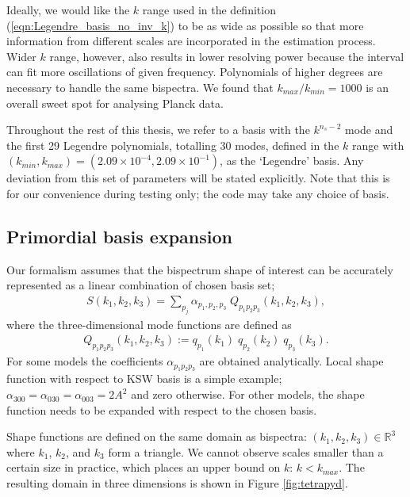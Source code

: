 Ideally, we would like the $k$ range used in the definition (\ref{eqn:Legendre_basis_no_inv_k}) to be as wide as possible so that more information from different scales are incorporated in the estimation process. Wider $k$ range, however, also results in lower resolving power because the interval can fit more oscillations of given frequency. Polynomials of higher degrees are necessary to handle the same bispectra. We found that $k_{max}/k_{min} = 1000$ is an overall sweet spot for analysing Planck data.

Throughout the rest of this thesis, we refer to a basis with the $k^{n_s - 2}$ mode and the first 29 Legendre polynomials, totalling 30 modes, defined in the $k$ range with $(k_{min}, k_{max}) = (2.09 \times 10^{-4}, 2.09 \times 10^{-1})$, as the `Legendre' basis. Any deviation from this set of parameters will be stated explicitly. Note that this is for our convenience during testing only; the code may take any choice of basis.


\subsection{Primordial basis expansion} \label{section:primordial_basis_expansion}

Our formalism assumes that the bispectrum shape of interest can be accurately represented as a linear combination of chosen basis set; 
\begin{align}
	S(k_1,k_2,k_3) = \sum_{p_j} \alpha_{p_1,p_2,p_3} \; Q_{p_1 p_2 p_3}(k_1, k_2, k_3),
\end{align}
where the three-dimensional mode functions are defined as
\begin{align}
	Q_{p_1 p_2 p_3} (k_1, k_2, k_3) := q_{p_1}(k_1) \; q_{p_2}(k_2) \; q_{p_3}(k_3).
\end{align}
For some models the coefficients $\alpha_{p_1 p_2 p_3}$ are obtained analytically. Local shape function with respect to KSW basis is a simple example; $\alpha_{300}=\alpha_{030}=\alpha_{003}=2A^2$ and zero otherwise. For other models, the shape function needs to be expanded with respect to the chosen basis. 

Shape functions are defined on the same domain as bispectra: $(k_1,k_2,k_3) \in \mathbb{R}^3$ where $k_1$, $k_2$, and $k_3$ form a triangle. We cannot observe scales smaller than a certain size in practice, which places an upper bound on $k$: $k < k_{max}$. The resulting domain in three dimensions is shown in Figure \ref{fig:tetrapyd}.

